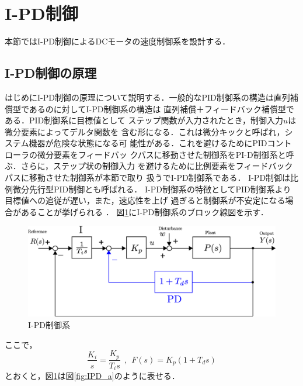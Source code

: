 \documentclass[a4paper,12pt]{jarticle}
\begin{document}
\section{I-PD制御}
本節ではI-PD制御によるDCモータの速度制御系を設計する．
\subsection{I-PD制御の原理}
はじめにI-PD制御の原理について説明する．一般的なPID制御系の構造は直列補
償型であるのに対してI-PD制御系の構造は
直列補償＋フィードバック補償型である．PID制御系に目標値として
ステップ関数が入力されたとき，制御入力$u$は微分要素によってデルタ関数を
含む形になる．これは微分キックと呼ばれ，システム機器が危険な状態になる可
能性がある．これを避けるためにPIDコントローラの微分要素をフィードバッ
クパスに移動させた制御系をPI-D制御系と呼ぶ．さらに，ステップ状の制御入力
を避けるために比例要素をフィードバックパスに移動させた制御系が本節で取り
扱うでI-PD制御系である．
%
I-PD制御は比例微分先行型PID制御とも呼ばれる．
I-PD制御系の特徴としてPID制御系より目標値への追従が遅い，また，速応性を上げ
過ぎると制御系が不安定になる場合があることが挙げられる
\cite{denki,kitamori,kitamori,wakaru,jiten}．
%
図\ref{fig:IPD_b}にI-PD制御系のブロック線図を示す．
%
\begin{figure}[bp]
 \begin{center}
  \includegraphics[width = 150mm]{fig/IPD_b.eps}
 \end{center}
 \caption{I-PD制御系}
 \label{fig:IPD_b}
\end{figure}
%
ここで，
%
\begin{equation}
 \frac{K_i}{s} = \frac{K_p}{T_is} \ \ , \ \ F(s) = K_p(1+T_d s)
\end{equation}
%
とおくと，図\ref{fig:IPD_b}は図\ref{fig:IPD_a}のように表せる．
%
\end{document}
